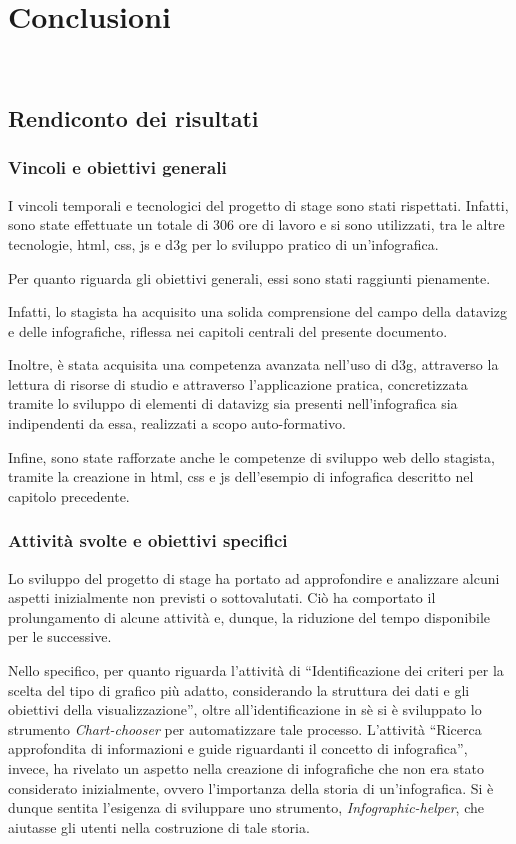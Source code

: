 \chapter{Conclusioni}
\label{cap:conclusioni}
\\

\section{Rendiconto dei risultati}
\subsection{Vincoli e obiettivi generali}
I vincoli temporali e tecnologici del progetto di stage sono stati rispettati. 
Infatti, sono state effettuate un totale di 306 ore di lavoro e si sono utilizzati, tra le altre tecnologie, 
\gls{html}, \gls{css}, \gls{js} e \gls{d3g} per lo sviluppo pratico di un'infografica.

\bigskip
\noindent Per quanto riguarda gli obiettivi generali, essi sono stati raggiunti pienamente.

Infatti, lo stagista ha acquisito una solida comprensione del campo 
della \gls{datavizg} e delle infografiche, riflessa nei capitoli centrali del presente documento. 

Inoltre, è stata acquisita una competenza avanzata nell'uso di \gls{d3g}, attraverso la lettura di risorse di studio e 
attraverso l'applicazione pratica, concretizzata tramite lo sviluppo di elementi di \gls{datavizg} sia presenti nell'infografica sia  
indipendenti da essa, realizzati a scopo auto-formativo.

Infine, sono state rafforzate anche le competenze di sviluppo web dello stagista, tramite la creazione in \gls{html}, \gls{css} e \gls{js} dell'esempio di infografica 
descritto nel capitolo precedente.

\subsection{Attività svolte e obiettivi specifici}
Lo sviluppo del progetto di stage ha portato ad approfondire e analizzare alcuni aspetti inizialmente non previsti o sottovalutati. 
Ciò ha comportato il prolungamento di alcune attività e, dunque, la riduzione del tempo disponibile per le successive.

Nello specifico, per quanto riguarda l'attività di ``Identificazione dei criteri per la scelta del tipo di grafico più adatto, considerando la struttura dei
dati e gli obiettivi della visualizzazione'', oltre all'identificazione in sè si è sviluppato lo strumento \emph{Chart-chooser} per automatizzare tale processo. 
L'attività ``Ricerca approfondita di informazioni e guide riguardanti il concetto di infografica'', invece, ha rivelato un aspetto nella creazione di infografiche che 
non era stato considerato inizialmente, ovvero l'importanza della storia di un'infografica. Si è dunque sentita l'esigenza di sviluppare uno strumento, 
\emph{Infographic-helper}, che aiutasse gli utenti nella costruzione di tale storia.

